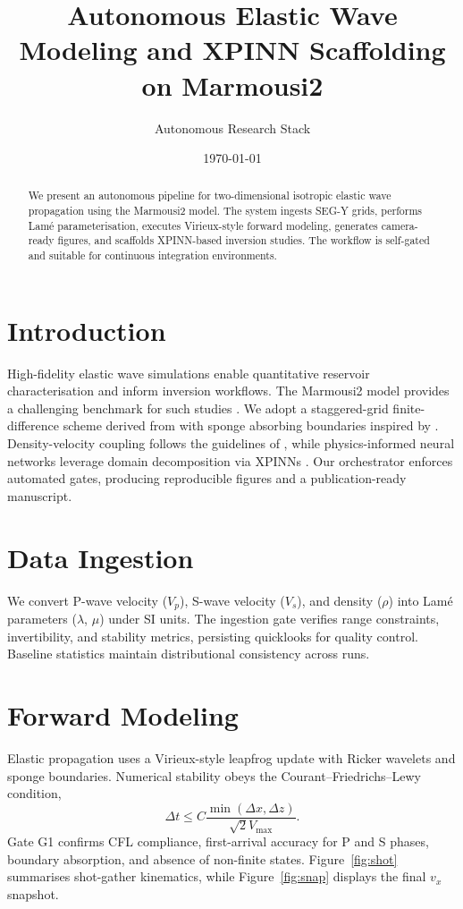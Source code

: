 \documentclass[11pt]{article}
\title{Autonomous Elastic Wave Modeling and XPINN Scaffolding on Marmousi2}
\author{Autonomous Research Stack}
\date{\today}
\begin{document}
\maketitle
\begin{abstract}
We present an autonomous pipeline for two-dimensional isotropic elastic wave propagation using the Marmousi2 model. The system ingests SEG-Y grids, performs Lam\'e parameterisation, executes Virieux-style forward modeling, generates camera-ready figures, and scaffolds XPINN-based inversion studies. The workflow is self-gated and suitable for continuous integration environments.
\end{abstract}

\section{Introduction}
High-fidelity elastic wave simulations enable quantitative reservoir characterisation and inform inversion workflows. The Marmousi2 model provides a challenging benchmark for such studies \citep{martin2006marmousi2}. We adopt a staggered-grid finite-difference scheme derived from \citet{virieux1986p} with sponge absorbing boundaries inspired by \citet{cerjan1985nonreflecting}. Density-velocity coupling follows the guidelines of \citet{gardner1974density}, while physics-informed neural networks leverage domain decomposition via XPINNs \citep{shukla2021parallel}. Our orchestrator enforces automated gates, producing reproducible figures and a publication-ready manuscript.

\section{Data Ingestion}
We convert P-wave velocity ($V_p$), S-wave velocity ($V_s$), and density ($\rho$) into Lam\'e parameters ($\lambda$, $\mu$) under SI units. The ingestion gate verifies range constraints, invertibility, and stability metrics, persisting quicklooks for quality control. Baseline statistics maintain distributional consistency across runs.

\section{Forward Modeling}
Elastic propagation uses a Virieux-style leapfrog update with Ricker wavelets and sponge boundaries. Numerical stability obeys the Courant--Friedrichs--Lewy condition,
\begin{equation}
\Delta t \leq C \frac{\min(\Delta x, \Delta z)}{\sqrt{2} V_{\max}}.
\end{equation}
Gate G1 confirms CFL compliance, first-arrival accuracy for P and S phases, boundary absorption, and absence of non-finite states. Figure~\ref{fig:shot} summarises shot-gather kinematics, while Figure~\ref{fig:snap} displays the final $v_x$ snapshot.
\end{document}
